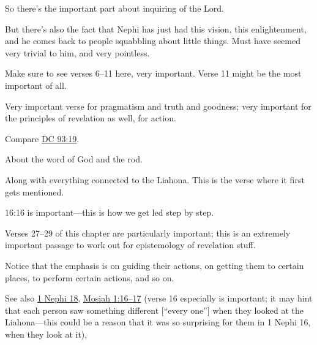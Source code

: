 \begin{compactdesc}
			\item[{\hyperref[1NEPHI-15-2]{1 Nephi 15:2--4, 6--11}}] \phantom{.}
				\begin{compactitem}
					\item So there's the important part about inquiring of the Lord.
					\item But there's also the fact that Nephi has just had this vision, this enlightenment, and he comes back to people squabbling about little things. Must have seemed very trivial to him, and very pointless.
					\item Make sure to see verses 6--11 here, very important. Verse 11 might be the most important of all.
				\end{compactitem}
			\item[{\hyperref[1NEPHI-15-14]{1 Nephi 15:14}}] \phantom{.}
				\begin{compactitem}
					\item Very important verse for pragmatism and truth and goodness; very important for the principles of revelation as well, for action.
					\item Compare \hyperref[DC93-19]{DC 93:19}.
				\end{compactitem}
			\item[{\hyperref[1NEPHI-15-23]{1 Nephi 15:23--24}}] \phantom{.}
				\begin{compactitem}
					\item About the word of God and the rod.
				\end{compactitem}
			\item[{\hyperref[1NEPHI-16-10]{1 Nephi 16:10}}] \phantom{.}
				\begin{compactitem}
					\item Along with everything connected to the Liahona. This is the verse where it first gets mentioned.
					\item 16:16 is important---this is how we get led step by step.
					\item Verses 27--29 of this chapter are particularly important; this is an extremely important passage to work out for epistemology of revelation stuff.
					\item Notice that the emphasis is on guiding their actions, on getting them to certain places, to perform certain actions, and so on.
					\item See also \hyperref[1NEPHI-18]{1 Nephi 18}, \hyperref[MOSIAH-1-16]{Mosiah 1:16--17} (verse 16 especially is important; it may hint that each person saw something different [``every one''] when they looked at the Liahona---this could be a reason that it was so surprising for them in 1 Nephi 16, when they look at it), 

\end{compactitem}
\end{compactdesc}
